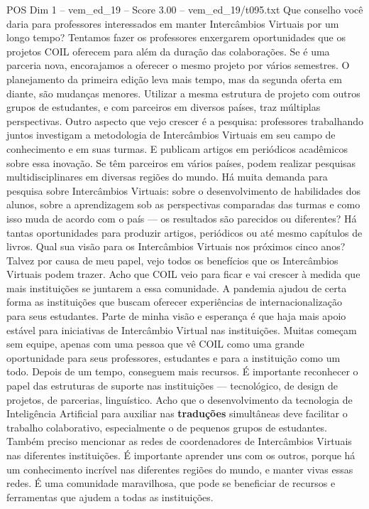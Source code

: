 \begin{textsample}{POS Dim 1 – vem\_ed\_19 – Score 3.00 – vem\_ed\_19/t095.txt}
Que conselho você daria para professores interessados em manter Intercâmbios Virtuais por um longo tempo?
Tentamos fazer os professores enxergarem oportunidades que os projetos COIL oferecem para além da duração das colaborações.
Se é uma parceria nova, encorajamos a oferecer o mesmo projeto por vários semestres.
O planejamento da primeira edição leva mais tempo, mas da segunda oferta em diante, são mudanças menores.
Utilizar a mesma estrutura de projeto com outros grupos de estudantes, e com parceiros em diversos países, traz múltiplas perspectivas.
Outro aspecto que vejo crescer é a pesquisa: professores trabalhando juntos investigam a metodologia de Intercâmbios Virtuais em seu campo de conhecimento e em suas turmas.
E publicam artigos em periódicos acadêmicos sobre essa inovação.
Se têm parceiros em vários países, podem realizar pesquisas multidisciplinares em diversas regiões do mundo.
Há muita demanda para pesquisa sobre Intercâmbios Virtuais: sobre o desenvolvimento de habilidades dos alunos, sobre a aprendizagem sob as perspectivas comparadas das turmas e como isso muda de acordo com o país — os resultados são parecidos ou diferentes?
Há tantas oportunidades para produzir artigos, periódicos ou até mesmo capítulos de livros.
Qual sua visão para os Intercâmbios Virtuais nos próximos cinco anos?
Talvez por causa de meu papel, vejo todos os benefícios que os Intercâmbios Virtuais podem trazer.
Acho que COIL veio para ficar e vai crescer à medida que mais instituições se juntarem a essa comunidade.
A pandemia ajudou de certa forma as instituições que buscam oferecer experiências de internacionalização para seus estudantes.
Parte de minha visão e esperança é que haja mais apoio estável para iniciativas de Intercâmbio Virtual nas instituições.
Muitas começam sem equipe, apenas com uma pessoa que vê COIL como uma grande oportunidade para seus professores, estudantes e para a instituição como um todo.
Depois de um tempo, conseguem mais recursos.
É importante reconhecer o papel das estruturas de suporte nas instituições — tecnológico, de design de projetos, de parcerias, linguístico.
Acho que o desenvolvimento da tecnologia de Inteligência Artificial para auxiliar nas \textbf{traduções} simultâneas deve facilitar o trabalho colaborativo, especialmente o de pequenos grupos de estudantes.
Também preciso mencionar as redes de coordenadores de Intercâmbios Virtuais nas diferentes instituições.
É importante aprender uns com os outros, porque há um conhecimento incrível nas diferentes regiões do mundo, e manter vivas essas redes.
É uma comunidade maravilhosa, que pode se beneficiar de recursos e ferramentas que ajudem a todas as instituições.

\end{textsample}
